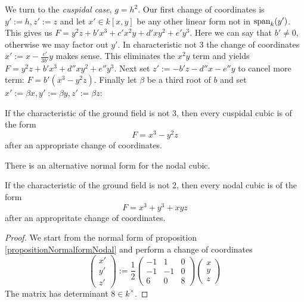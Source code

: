 We turn to the \emph{cuspidal case}, $g = h^2$.
Our first change of coordinates is $y' := h, z' := z$ and let $x' \in k[x,y]$ be any other linear form not in ${\operatorname{span}}_k(y')$.
This gives us $F = y^2z + b'x^3 + c'x^2y + d'xy^2 + e'y^3$.
Here we can say that $b' \neq 0$, otherwise we may factor out $y'$.
In characteristic not 3 the change of coordinates $x' := x - \frac{c'}{3b'}y$ makes sense.
This eliminates the $x^2y$ term and yields $F = y^2z + b'x^3 +  d''xy^2 + e''y^3$.
Next set $z' := -b'z -d''x -e''y$ to cancel more term: $F = b'(x^3 - y^2z)$.
Finally let $\beta$ be a third root of $b$ and set $x' := \beta x, y' := \beta y, z' := \beta z$:
\begin{proposition} \label{propositionNormalformCuspidal}
If the characteristic of the ground field is not 3, then every cuspidal cubic is of the form
\begin{equation}
F = x^3 - y^2z
\end{equation}
after an appropriate change of coordinates.
\end{proposition}

There is an alternative normal form for the nodal cubic.

\begin{proposition} \label{propositionNormalformNodal2}
If the characteristic of the ground field is not 2, then every nodal cubic is of the form
\begin{equation}
F = x^3 + y^3 + xyz
\end{equation}
after an appropritate change of coordinates.
\end{proposition}

\begin{proof}
We start from the normal form of proposition \ref{propositionNormalformNodal} and perform a change of coordinates
\begin{equation}
\begin{pmatrix} x' \\ y' \\ z' \end{pmatrix}
:=
\frac 12
\begin{pmatrix}
-1 & 1 & 0 \\
-1 & -1 & 0 \\
6 & 0 & 8
\end{pmatrix}
\begin{pmatrix} x \\ y \\ z \end{pmatrix}
\end{equation}
The matrix has determinant $8 \in k^\times$.
\end{proof}
